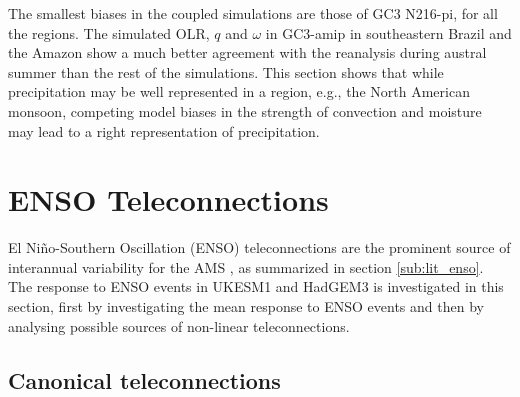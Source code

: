 The smallest biases in the coupled simulations are those of GC3 N216-pi, for all the regions.  The simulated OLR, $q$ and $\omega$ in GC3-amip in southeastern Brazil and the Amazon show a much better agreement with the reanalysis during austral summer than the rest of the simulations.
This section shows that while precipitation may be well represented in a region, e.g., the North American monsoon, competing model biases in the strength of convection and moisture may lead to a right representation of precipitation. 


\section{ENSO Teleconnections}\label{sq:enso1}

El Ni\~no-Southern Oscillation (ENSO) teleconnections are the prominent source of interannual variability for the AMS \citep{vera2006}, as summarized in section \ref{sub:lit_enso}.
The response to ENSO events in UKESM1 and HadGEM3 is investigated in this section, first by investigating the mean response to ENSO events and then by analysing possible sources of non-linear teleconnections.




\subsection{Canonical teleconnections}

